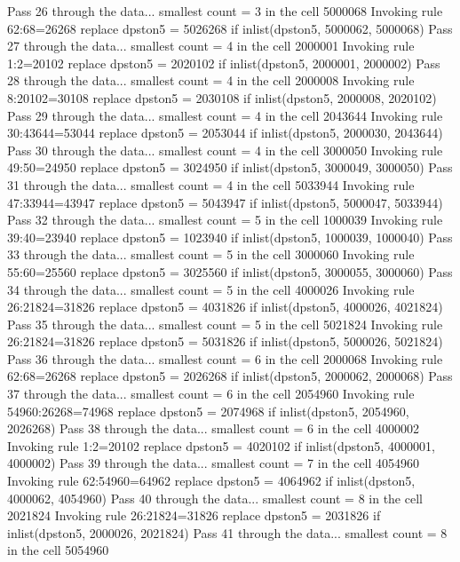 Pass 26 through the data...
  smallest count = 3 in the cell      5000068
  Invoking rule 62:68=26268
  replace dpston5 = 5026268 if inlist(dpston5, 5000062, 5000068)
Pass 27 through the data...
  smallest count = 4 in the cell      2000001
  Invoking rule 1:2=20102
  replace dpston5 = 2020102 if inlist(dpston5, 2000001, 2000002)
Pass 28 through the data...
  smallest count = 4 in the cell      2000008
  Invoking rule 8:20102=30108
  replace dpston5 = 2030108 if inlist(dpston5, 2000008, 2020102)
Pass 29 through the data...
  smallest count = 4 in the cell      2043644
  Invoking rule 30:43644=53044
  replace dpston5 = 2053044 if inlist(dpston5, 2000030, 2043644)
Pass 30 through the data...
  smallest count = 4 in the cell      3000050
  Invoking rule 49:50=24950
  replace dpston5 = 3024950 if inlist(dpston5, 3000049, 3000050)
Pass 31 through the data...
  smallest count = 4 in the cell      5033944
  Invoking rule 47:33944=43947
  replace dpston5 = 5043947 if inlist(dpston5, 5000047, 5033944)
Pass 32 through the data...
  smallest count = 5 in the cell      1000039
  Invoking rule 39:40=23940
  replace dpston5 = 1023940 if inlist(dpston5, 1000039, 1000040)
Pass 33 through the data...
  smallest count = 5 in the cell      3000060
  Invoking rule 55:60=25560
  replace dpston5 = 3025560 if inlist(dpston5, 3000055, 3000060)
Pass 34 through the data...
  smallest count = 5 in the cell      4000026
  Invoking rule 26:21824=31826
  replace dpston5 = 4031826 if inlist(dpston5, 4000026, 4021824)
Pass 35 through the data...
  smallest count = 5 in the cell      5021824
  Invoking rule 26:21824=31826
  replace dpston5 = 5031826 if inlist(dpston5, 5000026, 5021824)
Pass 36 through the data...
  smallest count = 6 in the cell      2000068
  Invoking rule 62:68=26268
  replace dpston5 = 2026268 if inlist(dpston5, 2000062, 2000068)
Pass 37 through the data...
  smallest count = 6 in the cell      2054960
  Invoking rule 54960:26268=74968
  replace dpston5 = 2074968 if inlist(dpston5, 2054960, 2026268)
Pass 38 through the data...
  smallest count = 6 in the cell      4000002
  Invoking rule 1:2=20102
  replace dpston5 = 4020102 if inlist(dpston5, 4000001, 4000002)
Pass 39 through the data...
  smallest count = 7 in the cell      4054960
  Invoking rule 62:54960=64962
  replace dpston5 = 4064962 if inlist(dpston5, 4000062, 4054960)
Pass 40 through the data...
  smallest count = 8 in the cell      2021824
  Invoking rule 26:21824=31826
  replace dpston5 = 2031826 if inlist(dpston5, 2000026, 2021824)
Pass 41 through the data...
  smallest count = 8 in the cell      5054960
